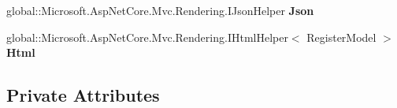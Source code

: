 \begin{DoxyCompactItemize}
global\+::\+Microsoft.\+Asp\+Net\+Core.\+Mvc.\+Rendering.\+I\+Json\+Helper {\bfseries Json}
\item 
\mbox{\label{class_projeto_e_s_w_1_1_areas_1_1_identity_1_1_pages_1_1_account_1_1_areas___identity___pages___account___register_a8f94972be221da91bdad7294409cab82}} 
global\+::\+Microsoft.\+Asp\+Net\+Core.\+Mvc.\+Rendering.\+I\+Html\+Helper$<$ Register\+Model $>$ {\bfseries Html}
\end{DoxyCompactItemize}
\subsection*{Private Attributes}

